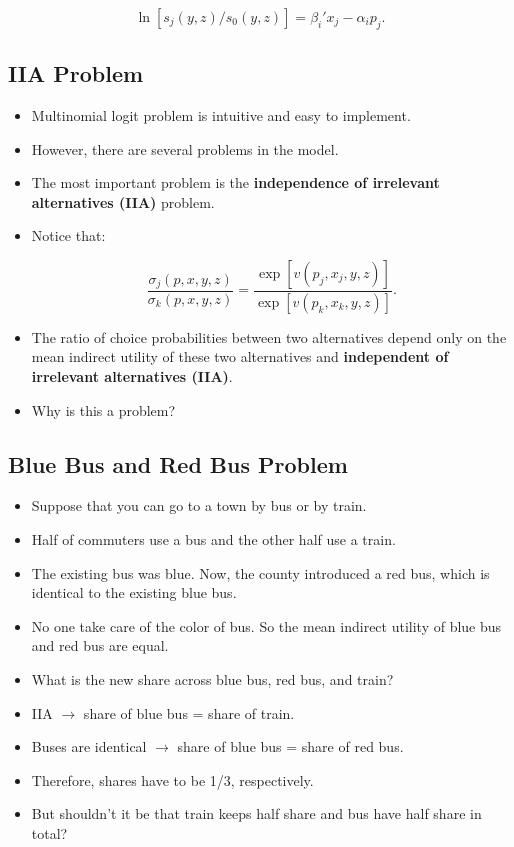 \documentclass[]{book}
\providecommand{\tightlist}{%
  \setlength{\itemsep}{0pt}\setlength{\parskip}{0pt}}
\begin{document}
\begin{equation}
\ln[s_{j}(y, z)/s_{0}(y, z)] = \beta_i' x_j - \alpha_i p_j.
\end{equation}

\subsection{IIA Problem}\label{iia-problem}

\begin{itemize}
\tightlist
\item
  Multinomial logit problem is intuitive and easy to implement.
\item
  However, there are several problems in the model.
\item
  The most important problem is the
  \textbf{independence of irrelevant alternatives (IIA)} problem.
\item
  Notice that:

  \begin{equation}
  \frac{\sigma_j(p, x, y, z)}{\sigma_{k}(p, x, y, z)} = \frac{\exp[v(p_j, x_j, y, z)]}{\exp[v(p_k, x_k, y, z)]}.
  \end{equation}
\item
  The ratio of choice probabilities between two alternatives depend only
  on the mean indirect utility of these two alternatives and
  \textbf{independent of irrelevant alternatives (IIA)}.
\item
  Why is this a problem?
\end{itemize}

\subsection{Blue Bus and Red Bus
Problem}\label{blue-bus-and-red-bus-problem}

\begin{itemize}
\tightlist
\item
  Suppose that you can go to a town by bus or by train.
\item
  Half of commuters use a bus and the other half use a train.
\item
  The existing bus was blue. Now, the county introduced a red bus, which
  is identical to the existing blue bus.
\item
  No one take care of the color of bus. So the mean indirect utility of
  blue bus and red bus are equal.
\item
  What is the new share across blue bus, red bus, and train?
\item
  IIA \(\to\) share of blue bus = share of train.
\item
  Buses are identical \(\to\) share of blue bus = share of red bus.
\item
  Therefore, shares have to be 1/3, respectively.
\item
  But shouldn't it be that train keeps half share and bus have half
  share in total?
\end{itemize}
\end{document}
